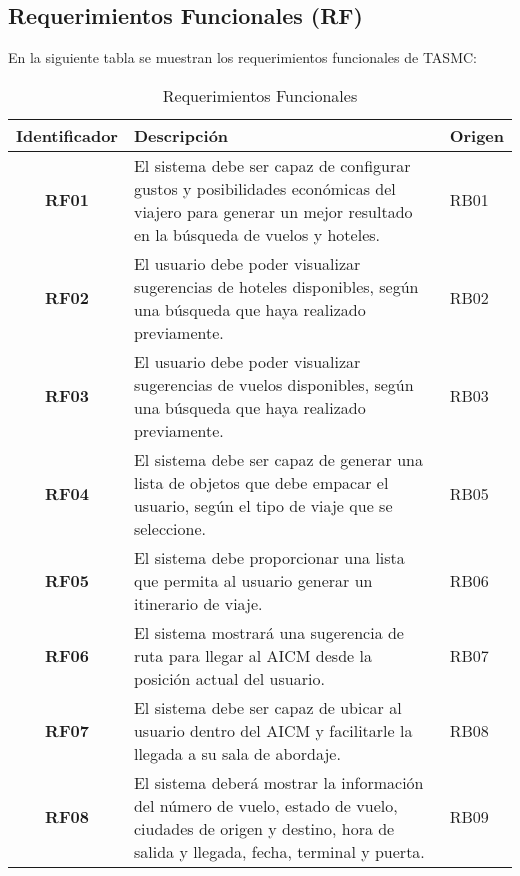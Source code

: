 \subsection{Requerimientos Funcionales (RF)}

En la siguiente tabla se muestran los requerimientos funcionales de TASMC:

\begin{table}
	\begin{center}
		\begin{tabular}{|c|p{9.4cm}|p{1.5cm}|}
			\hline \rowcolor[RGB]{0,102,204} 
				\textcolor{blanco}{\bf Identificador} &
				\textcolor{blanco}{\bf Descripción} &
				\textcolor{blanco}{\bf Origen} \\
			\hline \rowcolor[RGB]{224,224,224} 
				\textbf{RF01} &
				El sistema debe ser capaz de configurar gustos y posibilidades económicas del viajero para generar un mejor resultado en la búsqueda de vuelos y hoteles. &
				RB01 \\
      		\hline 
      			\textbf{RF02} &
				El usuario debe poder visualizar sugerencias de hoteles disponibles,  según una búsqueda que haya realizado previamente. &
				RB02 \\
			\hline \rowcolor[RGB]{224,224,224} 
				\textbf{RF03} &
				El usuario debe poder visualizar sugerencias de vuelos disponibles, según una búsqueda que haya realizado previamente. &
				RB03 \\ 
			\hline
				\textbf{RF04} &
				El sistema debe ser capaz de generar una lista de objetos que debe empacar el usuario, según el tipo de viaje que se seleccione. &
				RB05 \\ 
			\hline \rowcolor[RGB]{224,224,224} 
				\textbf{RF05} &
				El sistema debe proporcionar una lista que permita al usuario generar un itinerario de viaje. &
				RB06 \\ 
			\hline
				\textbf{RF06} &
				El sistema mostrará una sugerencia de ruta para llegar al AICM desde la posición actual del usuario. &
				RB07 \\ 
			\hline \rowcolor[RGB]{224,224,224} 
				\textbf{RF07} &
				El sistema debe ser capaz de ubicar al usuario dentro del AICM y facilitarle la llegada a su sala de abordaje. &
				RB08 \\ 
			\hline
				\textbf{RF08} &
				El sistema deberá mostrar la información del número de vuelo, estado de vuelo, ciudades de origen y destino, 					hora de salida y llegada, fecha, terminal y puerta. &
				RB09 \\ 
			\hline
		\end{tabular}
	\end{center}
	\caption[Requerimientos Funcionales]{Requerimientos Funcionales} 
	\label{tab:reqFuncionales}
\end{table}

